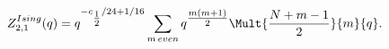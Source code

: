 \begin{equation}
Z_{2,1}^{Ising}(q) = q^{-c_{\tfrac{1}{2}}/24+1/16}
\sum_{m\,even} q^{\tfrac{m(m+1)}{2}} \Mult{\frac{N+m-1}{2}}{m}{q}.
\end{equation}

